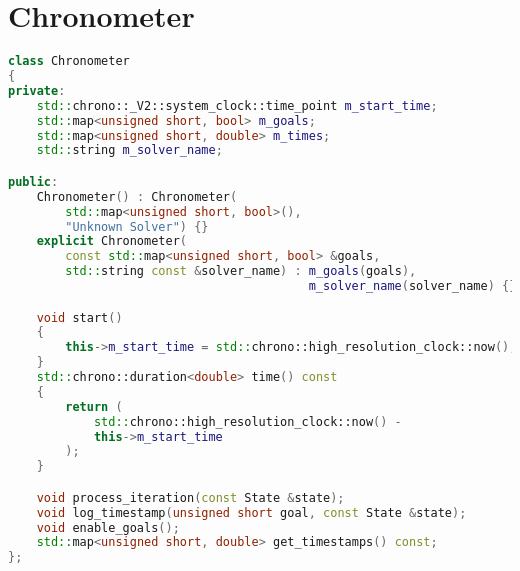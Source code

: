 
\section{Chronometer}

\begin{lstlisting}[language=C++, caption=Clase Chronometer utilizada para tomar mediciones, label=lst:Chronometer]
class Chronometer
{
private:
    std::chrono::_V2::system_clock::time_point m_start_time;
    std::map<unsigned short, bool> m_goals;
    std::map<unsigned short, double> m_times;
    std::string m_solver_name;

public:
    Chronometer() : Chronometer(
        std::map<unsigned short, bool>(),
        "Unknown Solver") {}
    explicit Chronometer(
        const std::map<unsigned short, bool> &goals,
        std::string const &solver_name) : m_goals(goals),
                                          m_solver_name(solver_name) {}

    void start()
    {
        this->m_start_time = std::chrono::high_resolution_clock::now();
    }
    std::chrono::duration<double> time() const
    {
        return (
            std::chrono::high_resolution_clock::now() -
            this->m_start_time
        );
    }

    void process_iteration(const State &state);
    void log_timestamp(unsigned short goal, const State &state);
    void enable_goals();
    std::map<unsigned short, double> get_timestamps() const;
};
\end{lstlisting}

\pagebreak
